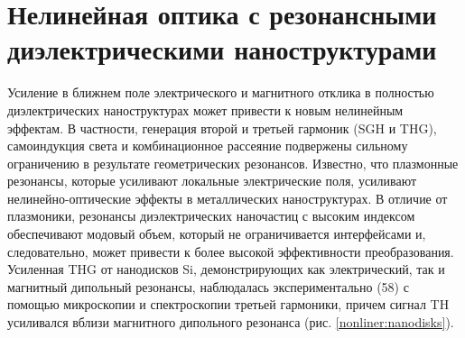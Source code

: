 \section{Нелинейная оптика с резонансными диэлектрическими наноструктурами}
Усиление в ближнем поле электрического и магнитного отклика в полностью диэлектрических наноструктурах может привести к новым нелинейным эффектам. В частности, генерация второй и третьей гармоник (SGH и THG), самоиндукция света и комбинационное рассеяние подвержены сильному ограничению в результате геометрических резонансов. Известно, что плазмонные резонансы, которые усиливают локальные электрические поля, усиливают нелинейно-оптические эффекты в металлических наноструктурах. В отличие от плазмоники, резонансы диэлектрических наночастиц с высоким индексом обеспечивают модовый объем, который не ограничивается интерфейсами и, следовательно, может привести к более высокой эффективности преобразования.
\\
\hspace*{2mm}
Усиленная THG от нанодисков Si, демонстрирующих как электрический, так и магнитный дипольный резонансы, наблюдалась экспериментально (58) с помощью микроскопии и спектроскопии третьей гармоники, причем сигнал TH усиливался вблизи магнитного дипольного резонанса (рис. \ref{nonliner:nanodisks}). 
